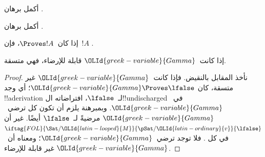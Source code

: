 \documentclass[../../../include/open-logic-section]{subfiles}
\begin{document}
\begin{prob}
أكمل برهان .
\end{prob}
\tagendprob

\begin{prob}
أكمل برهان .
\end{prob}
\tagendprob

\begin{cor}
إذا كان~$\Proves !A$، فإن~$!A$ .
\end{cor}

\begin{cor}
إذا كانت~$\OLId{greek-variable}{Gamma}$ قابلة للإرضاء، فهي متسقة.
\end{cor}

\begin{proof}
نأخذ المقابل بالنقيض. فإذا كانت~$\OLId{greek-variable}{Gamma}$ غير متسقة، كان
$\OLId{greek-variable}{Gamma} \Proves \lfalse$؛ أي وجد !!a{derivation} لـ~$\lfalse$،
افتراضاته ال!!{undischarged} في~$\OLId{greek-variable}{Gamma}$. وبمبرهنة
 يلزم أن تكون كل
ترضي~$\OLId{greek-variable}{Gamma}$ مرضيةً لـ~$\lfalse$ أيضًا. غير أن
$\iftag{FOL}{\Sat/{\OLId{latin-looped}{M}}}{\pSat/{\OLId{latin-ordinary}{v}}}{\lfalse}$ في كل
.
فلا توجد  ترضي~$\OLId{greek-variable}{Gamma}$؛
ومعناه أن~$\OLId{greek-variable}{Gamma}$ غير قابلة للإرضاء.
\end{proof}
\end{document}
